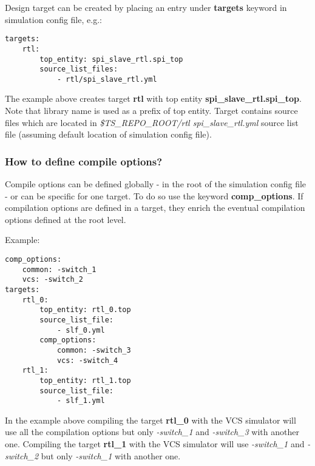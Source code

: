 \documentclass{tropic_design_spec}
\begin{document}
Design target can be created by placing an entry under \textbf{targets} keyword in
simulation config file, e.g.:

\begin{lstlisting}
targets:
    rtl:
        top_entity: spi_slave_rtl.spi_top
        source_list_files:
            - rtl/spi_slave_rtl.yml
\end{lstlisting}

The example above creates target \textbf{rtl} with top entity
\textbf{spi_slave_rtl.spi_top}. Note that library name is used as a prefix of top entity.
Target contains source files which are located in
\textit{\$TS_REPO_ROOT/rtl spi_slave_rtl.yml} source list file (assuming default location
of simulation config file).



\subsubsection{How to define compile options?}
\label{sec:how-to-define-compile-options}

Compile options can be defined globally - in the root of the simulation config file -
or can be specific for one target. To do so use the keyword \textbf{comp_options}.
If compilation options are defined in a target, they enrich the eventual compilation
options defined at the root level.

Example:

\begin{lstlisting}
comp_options:
    common: -switch_1
    vcs: -switch_2
targets:
    rtl_0:
        top_entity: rtl_0.top
        source_list_file:
            - slf_0.yml
        comp_options:
            common: -switch_3
            vcs: -switch_4
    rtl_1:
        top_entity: rtl_1.top
        source_list_file:
            - slf_1.yml
\end{lstlisting}

In the example above compiling the target \textbf{rtl_0} with the VCS simulator will use
all the compilation options but only \textit{-switch_1} and \textit{-switch_3}
with another one.
Compiling the target \textbf{rtl_1} with the VCS simulator will use \textit{-switch_1}
and \textit{-switch_2} but only \textit{-switch_1} with another one.
\end{document}
